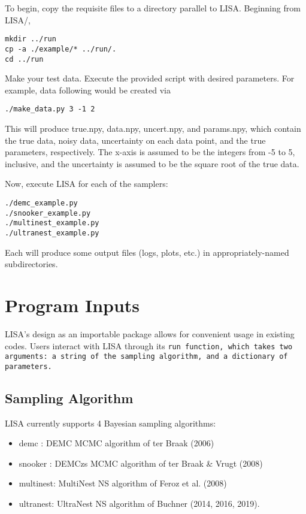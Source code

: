 \documentclass[letterpaper, 12pt]{article}
\begin{document}
\noindent To begin, copy the requisite files to a directory parallel to LISA. 
Beginning from LISA/, 
\begin{verbatim}
mkdir ../run
cp -a ./example/* ../run/.
cd ../run
\end{verbatim}

\noindent Make your test data.  Execute the provided script with 
desired parameters.  For example, data following  
would be created via
\begin{verbatim}
./make_data.py 3 -1 2
\end{verbatim}
\noindent This will produce true.npy, data.npy, uncert.npy, and params.npy, 
which contain the true data, noisy data, uncertainty on each data point, and 
the true parameters, respectively.  The x-axis is assumed to be the integers 
from -5 to 5, inclusive, and the uncertainty is assumed to be the square root 
of the true data.

\noindent Now, execute LISA for each of the samplers:

\begin{verbatim}
./demc_example.py
./snooker_example.py
./multinest_example.py
./ultranest_example.py
\end{verbatim}

\noindent Each will produce some output files (logs, plots, etc.) in appropriately-named 
subdirectories.


\section{Program Inputs}
\label{sec:inputs}

LISA's design as an importable package allows for convenient usage in existing 
codes.  Users interact with LISA through its \tt{run} function, which takes two 
arguments: a string of the sampling algorithm, and a dictionary of parameters.

\subsection{Sampling Algorithm}

LISA currently supports 4 Bayesian sampling algorithms:
\begin{itemize}
\item demc   : DEMC MCMC algorithm of ter Braak (2006)
\item snooker  : DEMCzs MCMC algorithm of ter Braak \& Vrugt (2008)
\item multinest: MultiNest NS algorithm of Feroz et al. (2008)
\item ultranest: UltraNest NS algorithm of Buchner (2014, 2016, 2019).
\end{itemize}
\end{document}
